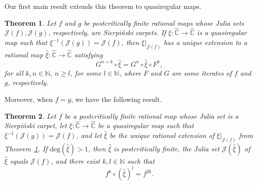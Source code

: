 \documentclass[12pt]{amsart}
\newtheorem{thm}{Theorem}[section]
\newcommand{\C}{\mathbb{C}}
\newcommand{\N}{\mathbb{N}}
\newcommand{\ra}{\rightarrow}
\newcommand{\hC}{\widehat{\C}}
\newcommand{\J}{\mathcal{J}}
\newcommand{\co}{\colon}
\begin{document}
Our first main result extends this theorem to quasiregular maps.
\begin{thm}\label{thm:main1}
	Let $f$ and $g$ be postcritically finite rational maps whose Julia sets $\J(f), \J(g)$, respectively, are Sierpi\'nski carpets.
 If $\xi\co\hC\to \hC$ is a quasiregular map such that
 $\xi^{-1}(\J(g))=\J(f)$, 
 then $\xi|_{\J(f)}$ has a unique extension to a rational map $\widehat{\xi}\co\hC\ra \hC$ satisfying
 \begin{equation}\label{eqn:fxi1}
 	G^{n+k}\circ\widehat\xi=G^n\circ\widehat\xi\circ F^k,
 \end{equation} 
 for all $k,n\in\N, \ n\ge l$, for some $l\in\N$, where $F$ and $G$ are some iterates of $f$ and $g$, respectively. 
\end{thm}
\noindent Moreover, when $f=g$, we have the following result.
\begin{thm}\label{thm:main2}
  Let $f$ be a postcritically finite rational map whose Julia set is a Sierpi\'nski carpet, let $\xi\co\hC\to \hC$ be a quasiregular map such that
  $\xi^{-1}(\J(g))=\J(f)$, and let $\widehat\xi$ be the unique rational extension of $\xi|_{\J(f)}$ from Theorem~\ref{thm:main1}. If $\mathrm{deg}(\widehat{\xi})>1$, then $\widehat{\xi}$ is postcritically finite, the Julia set $\J(\widehat\xi)$ of $\widehat\xi$ equals $\J(f)$,
  and there exist $k, l\in \N$ such that
  \begin{equation}\label{eqn:fxi2}
  f^k\circ (\widehat{\xi})^l=f^{2k}.
  \end{equation}
\end{thm}
\end{document}
